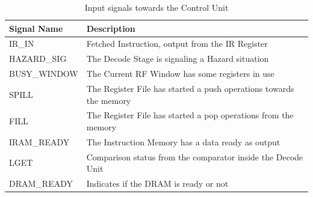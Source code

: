\begin{table}[H]
    \centering
    \begin{tabular}{l|l}
        \textbf{Signal Name} & \textbf{Description}\\
        \hline
        IR\_IN & Fetched Instruction, output from the IR Register \\
        HAZARD\_SIG & The Decode Stage is signaling a Hazard situation \\
        BUSY\_WINDOW & The Current RF Window has some registers in use \\
        SPILL & The Register File has started a push operations towards the memory \\
        FILL & The Register File has started a pop operations from the memory \\
        IRAM\_READY & The Instruction Memory has a data ready as output \\
        LGET & Comparison status from the comparator inside the Decode Unit\\
        DRAM\_READY & Indicates if the DRAM is ready or not\\
    \end{tabular}
    \caption{Input signals towards the Control Unit}
    \label{table:cu:input_signals}
\end{table}

